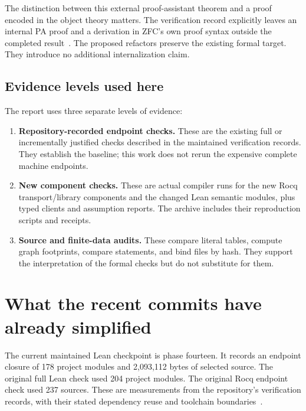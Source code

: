 \documentclass[11pt,letterpaper]{article}
\theoremstyle{definition}\newtheorem{definition}[theorem]{Definition}
\theoremstyle{remark}\newtheorem{remark}[theorem]{Remark}
\begin{document}
The distinction between this external proof-assistant theorem and a proof encoded in the object theory matters. The verification record explicitly leaves an internal PA proof and a derivation in ZFC's own proof syntax outside the completed result~\cite{verification}. The proposed refactors preserve the existing formal target. They introduce no additional internalization claim.

\subsection{Evidence levels used here}

The report uses three separate levels of evidence:
\begin{enumerate}
\item \textbf{Repository-recorded endpoint checks.} These are the existing full or incrementally justified checks described in the maintained verification records. They establish the baseline; this work does not rerun the expensive complete machine endpoints.
\item \textbf{New component checks.} These are actual compiler runs for the new Rocq transport/library components and the changed Lean semantic modules, plus typed clients and assumption reports. The archive includes their reproduction scripts and receipts.
\item \textbf{Source and finite-data audits.} These compare literal tables, compute graph footprints, compare statements, and bind files by hash. They support the interpretation of the formal checks but do not substitute for them.
\end{enumerate}

\section{What the recent commits have already simplified}

The current maintained Lean checkpoint is phase fourteen. It records an endpoint closure of 178 project modules and 2,093,112 bytes of selected source. The original full Lean check used 204 project modules. The original Rocq endpoint check used 237 sources. These are measurements from the repository's verification records, with their stated dependency reuse and toolchain boundaries~\cite{phase14,verification}.
\end{document}
